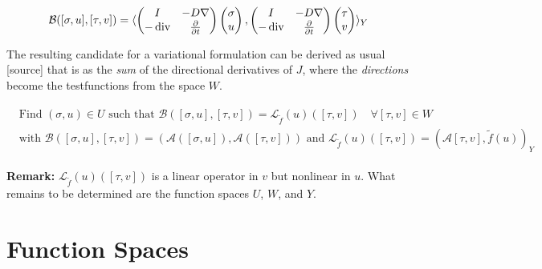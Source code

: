 \documentclass[../draft_1.tex]{subfiles}
\begin{document}
\begin{ceqn}
	\begin{equation}
	\begin{aligned}
	\mathcal{B} ([\sigma, u], [\tau, v]) = \langle \begin{pmatrix} 
	I & - D \nabla \\
	-\mathop{}\!\mathrm{div} & \frac{\partial}{\partial t}
	\end{pmatrix} 
	\begin{pmatrix}
	\sigma \\
	u
	\end{pmatrix}, 
	\begin{pmatrix}
	I & - D \nabla \\
	-\mathop{}\!\mathrm{div} & \frac{\partial}{\partial t}
	\end{pmatrix}
	\begin{pmatrix}
	\tau \\
	v
	\end{pmatrix} \rangle_Y
	\end{aligned}
	\end{equation}
\end{ceqn}
The resulting candidate for a variational formulation can be derived as usual [source] that is as the \textit{sum} of the directional derivatives of $J$, where the \textit{directions} become the testfunctions from the space $W$.

\begin{ceqn}
	\begin{align}
	\begin{aligned}
	\label{var_form}
	\text{ Find } (\sigma, u) \in U \text{ such that } \mathcal{B} ([\sigma, u], [\tau, v]) = \mathcal{L}_{\tilde{f}}(u)([\tau,v]) \quad \forall [\tau, v] \in W \\
 \text{ with } \mathcal{B} ([\sigma, u], [\tau, v]) = (\mathcal{A} ([\sigma, u]),  \mathcal{A} ([\tau, v])) \text{ and } \mathcal{L}_{\tilde{f}}(u)([\tau,v]) = (\mathcal{A}[\tau,v], \tilde{f}(u))_Y
\end{aligned}
	\end{align}
\end{ceqn}
\textbf{Remark:} $\mathcal{L}_{\tilde{f}}(u)([\tau,v])$ is a linear operator in $v$ but nonlinear in $u$. What remains to be determined are the function spaces $U$, $W$, and $Y$. 

\section{Function Spaces}
\end{document}
